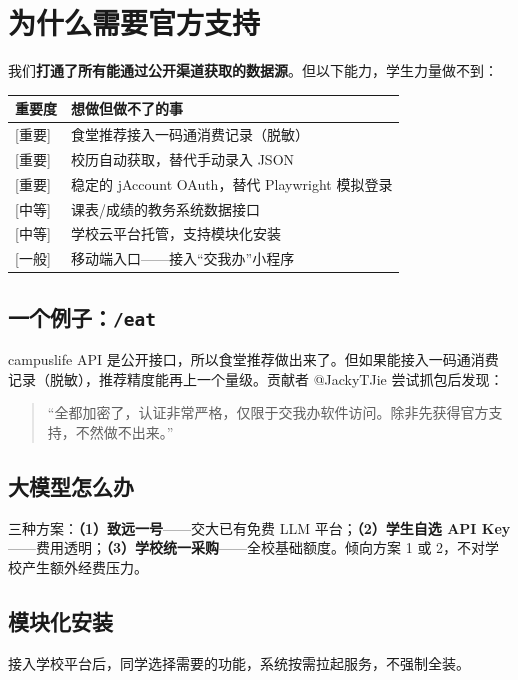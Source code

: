 \documentclass[11pt,a4paper]{ctexart}
\begin{document}
\section{为什么需要官方支持}

我们\textbf{打通了所有能通过公开渠道获取的数据源}。但以下能力，学生力量做不到：

\vspace{0.3em}
\begin{tabularx}{\textwidth}{lX}
\toprule
\textbf{重要度} & \textbf{想做但做不了的事} \\
\midrule
{[重要]} & 食堂推荐接入一码通消费记录（脱敏） \\
{[重要]} & 校历自动获取，替代手动录入 JSON \\
{[重要]} & 稳定的 jAccount OAuth，替代 Playwright 模拟登录 \\
{[中等]} & 课表/成绩的教务系统数据接口 \\
{[中等]} & 学校云平台托管，支持模块化安装 \\
{[一般]} & 移动端入口——接入“交我办”小程序 \\
\bottomrule
\end{tabularx}

\subsection*{一个例子：\texttt{/eat}}

campuslife API 是公开接口，所以食堂推荐做出来了。但如果能接入一码通消费记录（脱敏），推荐精度能再上一个量级。贡献者 @JackyTJie 尝试抓包后发现：
\begin{quote}\small
“全都加密了，认证非常严格，仅限于交我办软件访问。除非先获得官方支持，不然做不出来。”
\end{quote}

\subsection*{大模型怎么办}

三种方案：\textbf{（1）致远一号}——交大已有免费 LLM 平台；\textbf{（2）学生自选 API Key}——费用透明；\textbf{（3）学校统一采购}——全校基础额度。倾向方案 1 或 2，不对学校产生额外经费压力。

\subsection*{模块化安装}

接入学校平台后，同学选择需要的功能，系统按需拉起服务，不强制全装。
\end{document}
